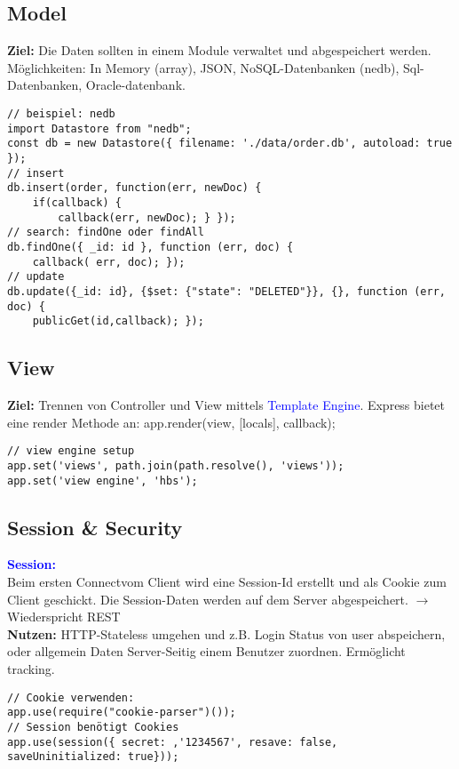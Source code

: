 \subsection{Model}
\textbf{Ziel:} Die Daten sollten in einem Module verwaltet und abgespeichert werden. Möglichkeiten: In Memory (array), JSON, NoSQL-Datenbanken (nedb), Sql-Datenbanken, Oracle-datenbank.
\begin{lstlisting}[style=htmlcssjs]
// beispiel: nedb
import Datastore from "nedb";
const db = new Datastore({ filename: './data/order.db', autoload: true });
// insert
db.insert(order, function(err, newDoc) {
    if(callback) {
        callback(err, newDoc); } });
// search: findOne oder findAll
db.findOne({ _id: id }, function (err, doc) {
    callback( err, doc); });
// update
db.update({_id: id}, {$set: {"state": "DELETED"}}, {}, function (err, doc) {
    publicGet(id,callback); });
\end{lstlisting}
\subsection{View}
\textbf{Ziel:} Trennen von Controller und View mittels \textcolor{blue}{Template Engine}. Express bietet eine render Methode an: app.render(view, [locals], callback);
\begin{lstlisting}[style=htmlcssjs]
// view engine setup
app.set('views', path.join(path.resolve(), 'views'));
app.set('view engine', 'hbs');
\end{lstlisting}
\subsection{Session \& Security}
\textbf{\textcolor{blue}{Session:}}\\
Beim ersten \dq Connect\dq vom Client wird eine Session-Id erstellt und als Cookie zum Client geschickt. Die Session-Daten werden auf dem Server abgespeichert. $\rightarrow$ Wiederspricht REST\\
\textbf{Nutzen:} HTTP-Stateless umgehen und z.B. Login Status von user abspeichern, oder allgemein Daten Server-Seitig einem Benutzer zuordnen. Ermöglicht tracking.
\begin{lstlisting}[style=htmlcssjs]
// Cookie verwenden:
app.use(require("cookie-parser")());
// Session benötigt Cookies
app.use(session({ secret: ‚'1234567', resave: false, saveUninitialized: true}));
\end{lstlisting}
